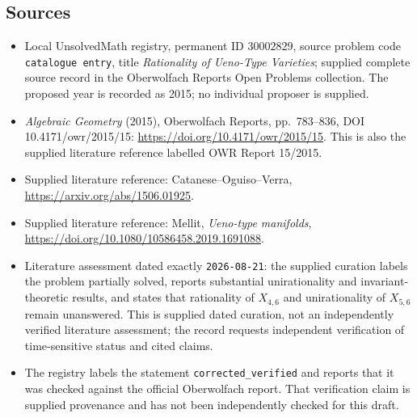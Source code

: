 \documentclass[11pt]{article}
\begin{document}
\subsection{Sources}
\begin{itemize}
\item Local UnsolvedMath registry, permanent ID \(30002829\), source problem code \texttt{catalogue entry}, title \emph{Rationality of Ueno-Type Varieties}; supplied complete source record in the Oberwolfach Reports Open Problems collection. The proposed year is recorded as 2015; no individual proposer is supplied.
\item \emph{Algebraic Geometry} (2015), Oberwolfach Reports, pp.\ 783--836, DOI 10.4171/owr/2015/15: \url{https://doi.org/10.4171/owr/2015/15}. This is also the supplied literature reference labelled OWR Report 15/2015.
\item Supplied literature reference: Catanese--Oguiso--Verra, \url{https://arxiv.org/abs/1506.01925}.
\item Supplied literature reference: Mellit, \emph{Ueno-type manifolds}, \url{https://doi.org/10.1080/10586458.2019.1691088}.
\item Literature assessment dated exactly \texttt{2026-08-21}: the supplied curation labels the problem partially solved, reports substantial unirationality and invariant-theoretic results, and states that rationality of \(X_{4,6}\) and unirationality of \(X_{5,6}\) remain unanswered. This is supplied dated curation, not an independently verified literature assessment; the record requests independent verification of time-sensitive status and cited claims.
\item The registry labels the statement \texttt{corrected\_verified} and reports that it was checked against the official Oberwolfach report. That verification claim is supplied provenance and has not been independently checked for this draft.
\end{itemize}
\end{document}
